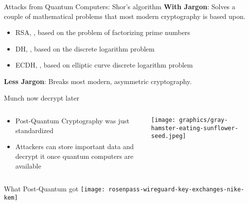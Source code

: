 \begin{frame}{Attacks from Quantum Computers: Shor's algorithm}
  \textbf{With Jargon}: Solves a couple of mathematical problems that most modern cryptography is based upon.
  \vfill
  \begin{itemize}
      \item RSA, , based on the problem of factorizing prime numbers
      \item DH, , based on the discrete logarithm problem
      \item ECDH, , based on elliptic curve discrete logarithm problem
  \end{itemize}
  \vfill
  \textbf{Less Jargon}: Breaks most modern, asymmetric cryptography.
\end{frame}

\begin{frame}{Munch now decrypt later}
  \begin{columns}[c]
    \begin{column}{.6\textwidth}
      \begin{itemize}
        \item Post-Quantum Cryptography was just standardized \citeMlkem
        \item Attackers can store important data and decrypt it once quantum computers are available
      \end{itemize}
    \end{column}

    \begin{column}{.4\textwidth}
      \texttt{[image: graphics/gray-hamster-eating-sunflower-seed.jpeg]}
    \end{column}
  \end{columns}
\end{frame}

\begin{frame}{What Post-Quantum got}
  \texttt{[image: rosenpass-wireguard-key-exchanges-nike-kem]}
\end{frame}

